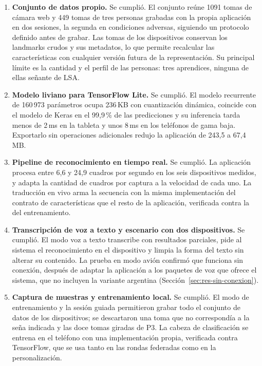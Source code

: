 \begin{enumerate}
    \item \textbf{Conjunto de datos propio.} Se cumplió. El conjunto reúne 1091 tomas de cámara web y 449 tomas de tres personas grabadas con la propia aplicación en dos sesiones, la segunda en condiciones adversas, siguiendo un protocolo definido antes de grabar. Las tomas de los dispositivos conservan los landmarks crudos y sus metadatos, lo que permite recalcular las características con cualquier versión futura de la representación. Su principal límite es la cantidad y el perfil de las personas: tres aprendices, ninguna de ellas señante de LSA.

    \item \textbf{Modelo liviano para TensorFlow Lite.} Se cumplió. El modelo recurrente de 160\,973 parámetros ocupa 236\,KB con cuantización dinámica, coincide con el modelo de Keras en el 99,9\,\% de las predicciones y su inferencia tarda menos de 2\,ms en la tableta y unos 8\,ms en los teléfonos de gama baja. Exportarlo sin operaciones adicionales redujo la aplicación de 243,5 a 67,4\,MB.

    \item \textbf{Pipeline de reconocimiento en tiempo real.} Se cumplió. La aplicación procesa entre 6,6 y 24,9 cuadros por segundo en los seis dispositivos medidos, y adapta la cantidad de cuadros por captura a la velocidad de cada uno. La traducción en vivo arma la secuencia con la misma implementación del contrato de características que el resto de la aplicación, verificada contra la del entrenamiento.

    \item \textbf{Transcripción de voz a texto y escenario con dos dispositivos.} Se cumplió. El modo voz a texto transcribe con resultados parciales, pide al sistema el reconocimiento en el dispositivo y limpia la forma del texto sin alterar su contenido. La prueba en modo avión confirmó que funciona sin conexión, después de adaptar la aplicación a los paquetes de voz que ofrece el sistema, que no incluyen la variante argentina (Sección~\ref{sec:res-sin-conexion}).

    \item \textbf{Captura de muestras y entrenamiento local.} Se cumplió. El modo de entrenamiento y la sesión guiada permitieron grabar todo el conjunto de datos de los dispositivos; se descartaron una toma que no correspondía a la seña indicada y las doce tomas giradas de P3. La cabeza de clasificación se entrena en el teléfono con una implementación propia, verificada contra TensorFlow, que se usa tanto en las rondas federadas como en la personalización.


\end{enumerate}
